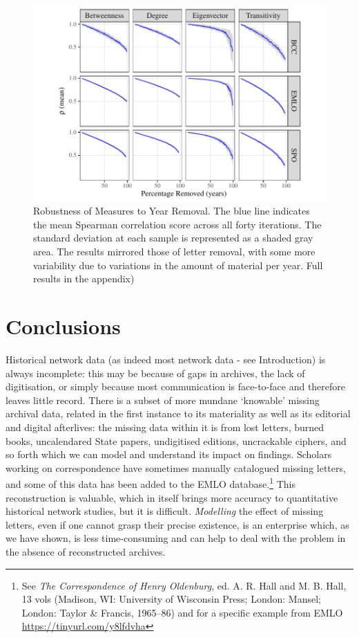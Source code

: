 \documentclass[]{article}
\begin{document}
\begin{figure}

{\centering \includegraphics{network_robustness_article_anon_files/figure-latex/unnamed-chunk-14-1} 

}

\caption{Robustness of Measures to Year Removal. The blue line indicates the mean Spearman correlation score across all forty iterations. The standard deviation at each sample is represented as a shaded gray area. The results mirrored those of letter removal, with some more variability due to variations in the amount of material per year. Full results in the appendix)}\label{fig:unnamed-chunk-14}
\end{figure}

\hypertarget{conclusions}{%
\section{Conclusions}\label{conclusions}}

Historical network data (as indeed most network data - see Introduction) is always incomplete: this may be because of gaps in archives, the lack of digitisation, or simply because most communication is face-to-face and therefore leaves little record. There is a subset of more mundane `knowable' missing archival data, related in the first instance to its materiality as well as its editorial and digital afterlives: the missing data within it is from lost letters, burned books, uncalendared State papers, undigitised editions, uncrackable ciphers, and so forth which we can model and understand its impact on findings. Scholars working on correspondence have sometimes manually catalogued missing letters, and some of this data has been added to the EMLO database.\footnote{See \emph{The Correspondence of Henry Oldenburg}, ed. A. R. Hall and M. B. Hall, 13 vols (Madison, WI: University of Wisconsin Press; London: Mansel; London: Taylor \& Francis, 1965--86) and for a specific example from EMLO \url{https://tinyurl.com/y8lfdvha}} This reconstruction is valuable, which in itself brings more accuracy to quantitative historical network studies, but it is difficult. \emph{Modelling} the effect of missing letters, even if one cannot grasp their precise existence, is an enterprise which, as we have shown, is less time-consuming and can help to deal with the problem in the absence of reconstructed archives.
\end{document}
